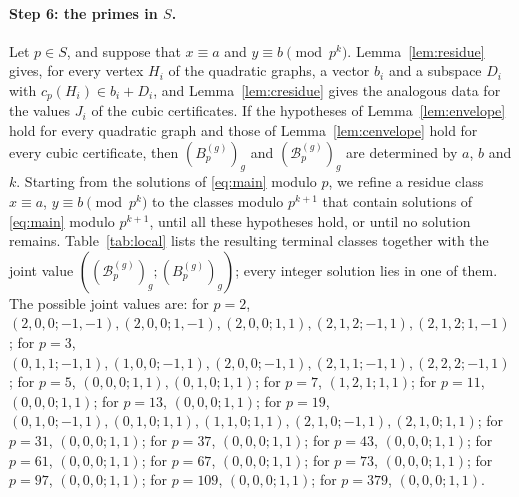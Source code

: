 \documentclass[11pt]{article}
\begin{document}
\paragraph{Step 6: the primes in $S$.} Let $p\in S$, and suppose that $x\equiv a$ and $y\equiv b\pmod{p^k}$. Lemma~\ref{lem:residue} gives, for every vertex $H_i$ of the quadratic graphs, a vector $b_i$ and a subspace $D_i$ with $c_p(H_i)\in b_i+D_i$, and Lemma~\ref{lem:cresidue} gives the analogous data for the values $J_i$ of the cubic certificates. If the hypotheses of Lemma~\ref{lem:envelope} hold for every quadratic graph and those of Lemma~\ref{lem:cenvelope} hold for every cubic certificate, then $(B^{(g)}_p)_g$ and $(\mathcal B^{(g)}_p)_g$ are determined by $a$, $b$ and $k$. Starting from the solutions of \eqref{eq:main} modulo $p$, we refine a residue class $x\equiv a$, $y\equiv b\pmod{p^k}$ to the classes modulo $p^{k+1}$ that contain solutions of \eqref{eq:main} modulo $p^{k+1}$, until all these hypotheses hold, or until no solution remains. Table~\ref{tab:local} lists the resulting terminal classes together with the joint value $((\mathcal B^{(g)}_p)_g;(B^{(g)}_p)_g)$; every integer solution lies in one of them. The possible joint values are: for $p=2$, $(2,0,0;-1,-1),\allowbreak (2,0,0;1,-1),\allowbreak (2,0,0;1,1),\allowbreak (2,1,2;-1,1),\allowbreak (2,1,2;1,-1)$; for $p=3$, $(0,1,1;-1,1),\allowbreak (1,0,0;-1,1),\allowbreak (2,0,0;-1,1),\allowbreak (2,1,1;-1,1),\allowbreak (2,2,2;-1,1)$; for $p=5$, $(0,0,0;1,1),\allowbreak (0,1,0;1,1)$; for $p=7$, $(1,2,1;1,1)$; for $p=11$, $(0,0,0;1,1)$; for $p=13$, $(0,0,0;1,1)$; for $p=19$, $(0,1,0;-1,1),\allowbreak (0,1,0;1,1),\allowbreak (1,1,0;1,1),\allowbreak (2,1,0;-1,1),\allowbreak (2,1,0;1,1)$; for $p=31$, $(0,0,0;1,1)$; for $p=37$, $(0,0,0;1,1)$; for $p=43$, $(0,0,0;1,1)$; for $p=61$, $(0,0,0;1,1)$; for $p=67$, $(0,0,0;1,1)$; for $p=73$, $(0,0,0;1,1)$; for $p=97$, $(0,0,0;1,1)$; for $p=109$, $(0,0,0;1,1)$; for $p=379$, $(0,0,0;1,1)$.
\end{document}
